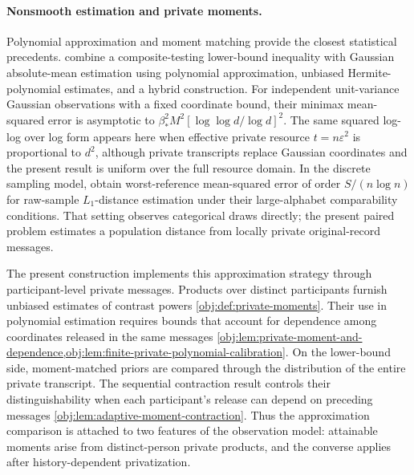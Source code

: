 \documentclass[11pt]{article}
\begin{document}
\paragraph{Nonsmooth estimation and private moments.}
Polynomial approximation and moment matching provide the closest statistical precedents. \citet[Theorem~1 and Sections~3--5]{CaiLow2011Nonsmooth} combine a composite-testing lower-bound inequality with Gaussian absolute-mean estimation using polynomial approximation, unbiased Hermite-polynomial estimates, and a hybrid construction. For independent unit-variance Gaussian observations with a fixed coordinate bound, their minimax mean-squared error is asymptotic to \(\beta_*^2M^2[\log\log d/\log d]^2\). The same squared log-log over log form appears here when effective private resource \(t=n\varepsilon^2\) is proportional to \(d^2\), although private transcripts replace Gaussian coordinates and the present result is uniform over the full resource domain. In the discrete sampling model, \citet[Theorems~2--4]{JiaoHanWeissman2018L1} obtain worst-reference mean-squared error of order \(S/(n\log n)\) for raw-sample \(L_1\)-distance estimation under their large-alphabet comparability conditions. That setting observes categorical draws directly; the present paired problem estimates a population distance from locally private original-record messages.

The present construction implements this approximation strategy through participant-level private messages. Products over distinct participants furnish unbiased estimates of contrast powers \cref{obj:def:private-moments}. Their use in polynomial estimation requires bounds that account for dependence among coordinates released in the same messages \cref{obj:lem:private-moment-and-dependence,obj:lem:finite-private-polynomial-calibration}. On the lower-bound side, moment-matched priors are compared through the distribution of the entire private transcript. The sequential contraction result controls their distinguishability when each participant's release can depend on preceding messages \cref{obj:lem:adaptive-moment-contraction}. Thus the approximation comparison is attached to two features of the observation model: attainable moments arise from distinct-person private products, and the converse applies after history-dependent privatization.
\end{document}
